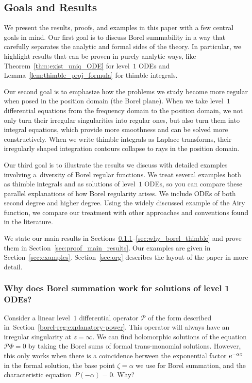\documentclass[pdftex]{sigma}
\numberwithin{equation}{section}
\begin{document}
\subsection{Goals and Results}
%
We present the results, proofs, and examples in this paper with a few central goals in mind. Our first goal is to discuss Borel summability in a way that carefully separates the analytic and formal sides of the theory. In particular, we highlight results that can be proven in purely analytic ways, like Theorem~\ref{thm:exist_uniq_ODE} for level~$1$ ODEs and Lemma~\ref{lem:thimble_proj_formula} for thimble integrals.

Our second goal is to emphasize how the problems we study become more regular when posed in the position domain (the Borel plane). When we take level~$1$ differential equations from the frequency domain to the position domain, we not only turn their irregular singularities into regular ones, but also turn them into integral equations, which provide more smoothness and can be solved more constructively. When we write thimble integrals as Laplace transforms, their irregularly shaped integration contours collapse to rays in the position domain.

Our third goal is to illustrate the results we discuss with detailed examples involving a~diversity of Borel regular functions. We treat several examples both as thimble integrals and as solutions of level~$1$ ODEs, so you can compare these parallel explanations of how Borel regularity arises. We include ODEs of both second degree and higher degree. Using the widely discussed example of the Airy function, we compare our treatment with other approaches and conventions found in the literature.

We state our main results in Sections~\ref{sec:why_borel_ODE}--\ref{sec:why_borel_thimble} and prove them in Section~\ref{sec:proof_main_results}. Our examples are given in Section~\ref{sec:examples}. Section~\ref{sec:org} describes the layout of the paper in more detail.
%
\subsubsection[Why does Borel summation work for solutions of level 1 ODEs?]{Why does Borel summation work for solutions of level 1 ODEs?}\label{sec:why_borel_ODE}

Consider a linear level~$1$ differential operator $\mathcal{P}$ of the form described in~Section~\ref{borel-reg:explanatory-power}. This operator will always have an irregular singularity at $z = \infty$. We can find holomorphic solutions of the equation $\mathcal{P}\Phi = 0$ by taking the Borel sums of formal trans-monomial solutions. However, this only works when there is a coincidence between the exponential factor ${\rm e}^{-\alpha z}$ in the formal solution, the base point $\zeta = \alpha$ we use for Borel summation, and the characteristic equation~${P(-\alpha) = 0}$. Why?
\end{document}
